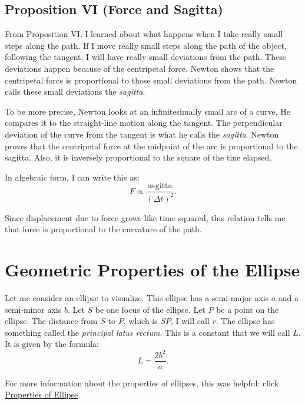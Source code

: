 \documentclass[12pt]{article}
\begin{document}
\subsection*{Proposition VI (Force and Sagitta)}

From Proposition VI, I learned about what happens when I take really small steps along the path. If I move really small steps along the path of the object, following the tangent, I will have really small deviations from the path. These deviations happen because of the centripetal force. Newton shows that the centripetal force is proportional to those small deviations from the path. Newton calls these small deviations the \emph{sagitta}.

To be more precise, Newton looks at an infinitesimally small arc of a curve. He compares it to the straight-line motion along the tangent. The perpendicular deviation of the curve from the tangent is what he calls the \emph{sagitta}. Newton proves that the centripetal force at the midpoint of the arc is proportional to the sagitta. Also, it is inversely proportional to the square of the tine elapsed.

In algebraic form, I can write this as:
\[
F \propto \frac{\text{sagitta}}{(\Delta t)^2}.
\]

Since displacement due to force grows like time squared, this relation tells me that force is proportional to the curvature of the path.

\section*{Geometric Properties of the Ellipse}

Let me consider an ellipse to visualize. This ellipse has a semi-major axis $a$ and a semi-minor axis $b$. Let $S$ be one focus of the ellipse. Let $P$ be a point on the ellipse. The distance from $S$ to $P$, which is $SP$, I will call $r$. The ellipse has something called the \emph{principal latus rectum}. This is a constant that we will call $L$. It is given by the formula:
\[
L = \frac{2b^{2}}{a}.
\]

For more information about the properties of ellipses, this was helpful: click \href{https://byjus.com/jee/properties-of-ellipse/}{Properties of Ellipse}.
\end{document}
